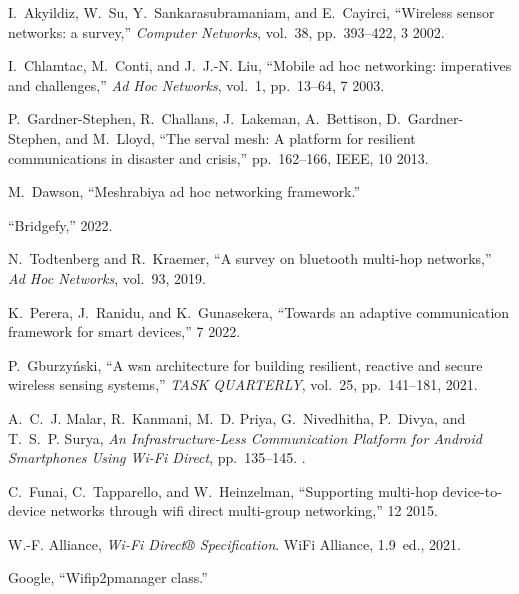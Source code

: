 \documentclass[12pt, conference, onecolumn, a4paper]{IEEEtran}
\begin{document}
\begin{thebibliography}{10}

    I.~Akyildiz, W.~Su, Y.~Sankarasubramaniam, and E.~Cayirci, ``Wireless sensor
      networks: a survey,'' {\em Computer Networks}, vol.~38, pp.~393--422, 3 2002.
    
    I.~Chlamtac, M.~Conti, and J.~J.-N. Liu, ``Mobile ad hoc networking:
      imperatives and challenges,'' {\em Ad Hoc Networks}, vol.~1, pp.~13--64, 7
      2003.
    
    P.~Gardner-Stephen, R.~Challans, J.~Lakeman, A.~Bettison, D.~Gardner-Stephen,
      and M.~Lloyd, ``The serval mesh: A platform for resilient communications in
      disaster and crisis,'' pp.~162--166, IEEE, 10 2013.
    
    M.~Dawson, ``Meshrabiya ad hoc networking framework.''
    
    ``Bridgefy,'' 2022.
    
    N.~Todtenberg and R.~Kraemer, ``A survey on bluetooth multi-hop networks,''
      {\em Ad Hoc Networks}, vol.~93, 2019.
    
    K.~Perera, J.~Ranidu, and K.~Gunasekera, ``Towards an adaptive communication
      framework for smart devices,'' 7 2022.
    
    P.~Gburzyński, ``A wsn architecture for building resilient, reactive and
      secure wireless sensing systems,'' {\em TASK QUARTERLY}, vol.~25,
      pp.~141--181, 2021.
    
    A.~C.~J. Malar, R.~Kanmani, M.~D. Priya, G.~Nivedhitha, P.~Divya, and T.~S.~P.
      Surya, {\em An Infrastructure-Less Communication Platform for Android
      Smartphones Using Wi-Fi Direct}, pp.~135--145.
    .
    
    C.~Funai, C.~Tapparello, and W.~Heinzelman, ``Supporting multi-hop
      device-to-device networks through wifi direct multi-group networking,'' 12
      2015.
    
    W.-F. Alliance, {\em Wi-Fi Direct® Specification}.
    \newblock WiFi Alliance, 1.9~ed., 2021.
    
    Google, ``Wifip2pmanager class.''
    
    \end{thebibliography}
    
\end{document}

